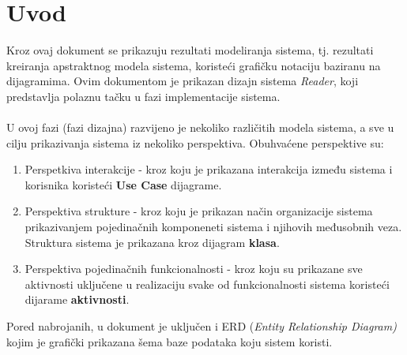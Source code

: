 \chapter{Uvod}

Kroz ovaj dokument se prikazuju rezultati modeliranja sistema, tj. rezultati kreiranja apstraktnog modela sistema, koristeći grafičku notaciju baziranu na dijagramima. Ovim dokumentom je prikazan dizajn sistema \textit{Reader}, koji predstavlja polaznu tačku u fazi implementacije sistema.\\\\U ovoj fazi (fazi dizajna) razvijeno je nekoliko različitih modela sistema, a sve u cilju prikazivanja sistema iz nekoliko perspektiva. Obuhvaćene perspektive su:
\begin{enumerate}
    \item Perspetkiva interakcije - kroz koju je prikazana interakcija između sistema i korisnika koristeći \textbf{Use Case} dijagrame.
    \item Perspektiva strukture - kroz koju je prikazan način organizacije sistema prikazivanjem pojedinačnih komponeneti sistema i njihovih međusobnih veza. Struktura sistema je prikazana kroz dijagram \textbf{klasa}.
    \item Perspektiva pojedinačnih funkcionalnosti - kroz koju su prikazane sve aktivnosti uključene u realizaciju svake od funkcionalnosti sistema koristeći dijarame \textbf{aktivnosti}.
\end{enumerate}

Pored nabrojanih, u dokument je uključen i ERD (\textit{Entity Relationship Diagram)} kojim je grafički prikazana šema baze podataka koju sistem koristi.